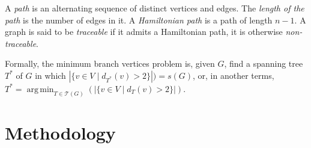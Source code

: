 \documentclass[12pt]{article}
\DeclareMathOperator*{\argmin}{arg\,min}
\begin{document}
A \emph{path} is an alternating sequence of distinct vertices and edges.
The \emph{length of the path} is the number of edges in it.
A \emph{Hamiltonian path} is a path of length $n - 1$.
A graph is said to be \emph{traceable} if it admits a Hamiltonian path, it is otherwise \emph{non-traceable}.

Formally, the minimum branch vertices problem is, given $G$, find a spanning tree $T^*$ of $G$ in which $|\{v \in V \mid d_{T^*}(v) > 2 \}|) = s(G)$, or, in another terms, $T^* = \argmin_{T \in \mathcal{T}(G)}(|\{ v \in V \mid d_T(v) > 2\}|)$.

\section{Methodology}



\end{document}
